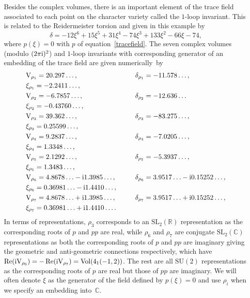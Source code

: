 \documentclass[pdftex]{sigma}
\numberwithin{equation}{section}
\def\BR{\mathbb{R}}
\def\BC{\mathbb{C}}
\def\SL{\mathrm{SL}}
\def\VC{\mathrm{VC}}
\def\SL{\mathrm{SL}}
\def\BR{\mathbb R}
\def\BC{\mathbb C}
\def\SL{\mathrm{SL}}
\def\Re{\operatorname{Re}}
\def\VC{\mathrm{V}}
\begin{document}
Besides the complex volumes, there is an important element of the trace field associated to each point on the character variety called the $1$-loop invariant. This is related to the Reidermeister torsion and given in this example by
\[
 \delta =-12\xi^6+15\xi^5+31\xi^4-74\xi^3+133\xi^2-66\xi-74 ,
\]
where $p(\xi)=0$ with $p$ of equation~\eqref{tracefield}. The seven complex volumes \big(modulo $(2\pi {\rm i})^2$\big) and $1$-loop invariants with corresponding generator of an embedding of the trace field are given numerically~by
\begin{gather*}
\begin{aligned}
&\VC_{\rho_1} = 20.297\dots, && \delta_{\rho_1}  = -11.578\dots, \\
&\xi_{\rho_1} = -2.2411\dots,\\
&\VC_{\rho_2} = -6.7857\dots, && \delta_{\rho_2}  = -12.636\dots \\
& \xi_{\rho_2}  = -0.43760\dots,\\
&\VC_{\rho_3} = 39.362\dots, && \delta_{\rho_3}  = -83.275\dots,\\
 & \xi_{\rho_3}  = 0.25599\dots,\\
&\VC_{\rho_4} = 9.2837\dots, && \delta_{\rho_4}  = -7.0205\dots,\\
 & \xi_{\rho_4}  = 1.3348\dots,\\
&\VC_{\rho_5} = 2.1292\dots, && \delta_{\rho_5}  = -5.3937\dots,\\
 & \xi_{\rho_5}  = 1.3483\dots,\\
&\VC_{\rho_6} = 4.8678\ldots - {\rm i}1.3985\dots, \qquad && \delta_{\rho_6}  = 3.9517\ldots - {\rm i}0.15252\dots,\\
 & \xi_{\rho_6}  = 0.36981\ldots-{\rm i}1.4410\dots,\\
&\VC_{\rho_7} = 4.8678\ldots + {\rm i}1.3985\dots, \qquad && \delta_{\rho_7}  = 3.9517\ldots + {\rm i}0.15252\dots,\\
& \xi_{\rho_7}  = 0.36981\ldots+{\rm i}1.4410\dots .
\end{aligned}
\end{gather*}
In terms of representations, $\rho_{3}$ corresponds to an $\SL_{2}(\BR)$ representation as the corresponding roots of $p$ and $pp$ are real, while $\rho_{6}$ and $\rho_{7}$ are conjugate $\SL_{2}(\BC)$ representations as both the corresponding roots of $p$ and $pp$ are imaginary giving the geometric and anti-geometric connections respectively, which have $\Re({\rm i}\VC_{\rho_{6}})=-\Re({\rm i}\VC_{\rho_{7}})=\mathrm{Vol}(4_{1}(-1,2))$. The rest are all $\mathrm{SU}(2)$ representations as the corresponding roots of $p$ are real but those of $pp$ are imaginary. We will often denote $\xi$ as the generator of the field defined by $p(\xi)=0$ and use $\rho_i$ when we specify an embedding into~$\BC$.
\end{document}
